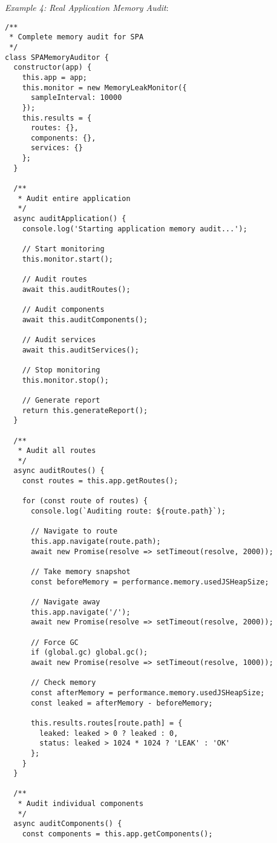 \documentclass[11pt]{article}
\begin{document}
\emph{Example 4: Real Application Memory Audit}:

\begin{verbatim}
/**
 * Complete memory audit for SPA
 */
class SPAMemoryAuditor {
  constructor(app) {
    this.app = app;
    this.monitor = new MemoryLeakMonitor({
      sampleInterval: 10000
    });
    this.results = {
      routes: {},
      components: {},
      services: {}
    };
  }
  
  /**
   * Audit entire application
   */
  async auditApplication() {
    console.log('Starting application memory audit...');
    
    // Start monitoring
    this.monitor.start();
    
    // Audit routes
    await this.auditRoutes();
    
    // Audit components
    await this.auditComponents();
    
    // Audit services
    await this.auditServices();
    
    // Stop monitoring
    this.monitor.stop();
    
    // Generate report
    return this.generateReport();
  }
  
  /**
   * Audit all routes
   */
  async auditRoutes() {
    const routes = this.app.getRoutes();
    
    for (const route of routes) {
      console.log(`Auditing route: ${route.path}`);
      
      // Navigate to route
      this.app.navigate(route.path);
      await new Promise(resolve => setTimeout(resolve, 2000));
      
      // Take memory snapshot
      const beforeMemory = performance.memory.usedJSHeapSize;
      
      // Navigate away
      this.app.navigate('/');
      await new Promise(resolve => setTimeout(resolve, 2000));
      
      // Force GC
      if (global.gc) global.gc();
      await new Promise(resolve => setTimeout(resolve, 1000));
      
      // Check memory
      const afterMemory = performance.memory.usedJSHeapSize;
      const leaked = afterMemory - beforeMemory;
      
      this.results.routes[route.path] = {
        leaked: leaked > 0 ? leaked : 0,
        status: leaked > 1024 * 1024 ? 'LEAK' : 'OK'
      };
    }
  }
  
  /**
   * Audit individual components
   */
  async auditComponents() {
    const components = this.app.getComponents();
    

\end{verbatim}
\end{document}
